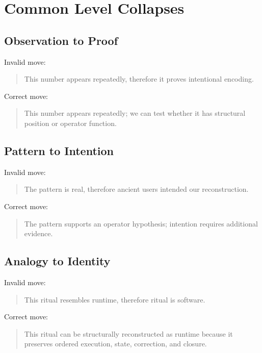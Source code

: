 \documentclass[11pt]{book}
\begin{document}
\section{Common Level Collapses}

\subsection{Observation to Proof}

Invalid move:

\begin{quote}
This number appears repeatedly, therefore it proves intentional encoding.
\end{quote}

Correct move:

\begin{quote}
This number appears repeatedly; we can test whether it has structural position or operator function.
\end{quote}

\subsection{Pattern to Intention}

Invalid move:

\begin{quote}
The pattern is real, therefore ancient users intended our reconstruction.
\end{quote}

Correct move:

\begin{quote}
The pattern supports an operator hypothesis; intention requires additional evidence.
\end{quote}

\subsection{Analogy to Identity}

Invalid move:

\begin{quote}
This ritual resembles runtime, therefore ritual is software.
\end{quote}

Correct move:

\begin{quote}
This ritual can be structurally reconstructed as runtime because it preserves ordered execution, state, correction, and closure.
\end{quote}
\end{document}
